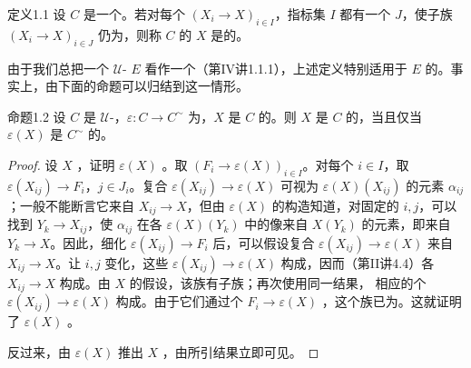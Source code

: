 \begin{SGAresult}{定义}{1.1}
设 $C$ 是一个。若对每个 $(X_i\to X)_{i\in I}$，指标集 $I$ 都有一个 $J$，使子族 $(X_i\to X)_{i\in J}$ 仍为，则称 $C$ 的 $X$ 是的。
\end{SGAresult}
由于我们总把一个 $\mathcal U$- $E$ 看作一个（第IV讲1.1.1），上述定义特别适用于 $E$ 的。事实上，由下面的命题可以归结到这一情形。
\begin{SGAresult}{命题}{1.2}
设 $C$ 是 $\mathcal U$-，$\varepsilon:C\to C^{\sim}$ 为，$X$ 是 $C$ 的。则 $X$ 是 $C$ 的，当且仅当 $\varepsilon(X)$ 是 $C^{\sim}$ 的。
\end{SGAresult}
\begin{proof}
设 $X$ ，证明 $\varepsilon(X)$ 。取 $(F_i\to\varepsilon(X))_{i\in I}$。对每个 $i\in I$，取 $\varepsilon(X_{ij})\to F_i$，$j\in J_i$。复合 $\varepsilon(X_{ij})\to\varepsilon(X)$ 可视为 $\varepsilon(X)(X_{ij})$ 的元素 $\alpha_{ij}$；一般不能断言它来自 $X_{ij}\to X$，但由 $\varepsilon(X)$ 的构造知道，对固定的 $i,j$，可以找到 $Y_k\to X_{ij}$，使 $\alpha_{ij}$ 在各 $\varepsilon(X)(Y_k)$ 中的像来自 $X(Y_k)$ 的元素，即来自 $Y_k\to X$。因此，细化 $\varepsilon(X_{ij})\to F_i$ 后，可以假设复合 $\varepsilon(X_{ij})\to\varepsilon(X)$ 来自 $X_{ij}\to X$。让 $i,j$ 变化，这些 $\varepsilon(X_{ij})\to\varepsilon(X)$ 构成，因而（第II讲4.4）各 $X_{ij}\to X$ 构成。由 $X$ 的假设，该族有子族；再次使用同一结果，
相应的个 $\varepsilon(X_{ij})\to\varepsilon(X)$ 构成。由于它们通过个 $F_i\to\varepsilon(X)$ ，这个族已为。这就证明了 $\varepsilon(X)$ 。

反过来，由 $\varepsilon(X)$ 推出 $X$ ，由所引结果立即可见。
\end{proof}
